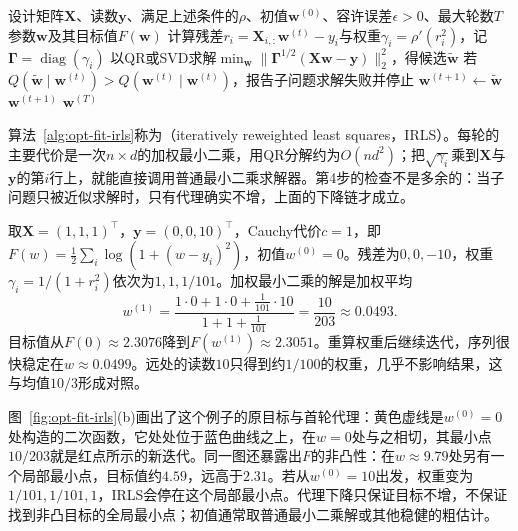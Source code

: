 \begin{algorithm}[迭代重加权最小二乘]
\label{alg:opt-fit-irls}
\begin{algorithmic}[1]
\Require 设计矩阵$\bm X$、读数$\bm y$、满足上述条件的$\rho$、初值$\bm w^{(0)}$、容许误差$\epsilon>0$、最大轮数$T$
\Ensure 参数$\bm w$及其目标值$F(\bm w)$
  \State 计算残差$r_i=\bm X_{i,:}\bm w^{(t)}-y_i$与权重$\gamma_i=\rho'(r_i^2)$，记$\bm\Gamma=\operatorname{diag}(\gamma_i)$
  \State 以QR或SVD求解$\min_{\bm w}\|\bm\Gamma^{1/2}(\bm X\bm w-\bm y)\|_2^2$，得候选$\tilde{\bm w}$
  \State 若$Q(\tilde{\bm w}\mid\bm w^{(t)})>Q(\bm w^{(t)}\mid\bm w^{(t)})$，报告子问题求解失败并停止
  \State $\bm w^{(t+1)}\gets\tilde{\bm w}$
    \State \Return $\bm w^{(t+1)}$
  \EndIf
\EndFor
\State \Return $\bm w^{(T)}$
\end{algorithmic}
\end{algorithm}

算法~\ref{alg:opt-fit-irls}称为（iteratively reweighted least squares，IRLS）。每轮的主要代价是一次$n\times d$的加权最小二乘，用QR分解约为$O(nd^2)$；把$\sqrt{\gamma_i}$乘到$\bm X$与$\bm y$的第$i$行上，就能直接调用普通最小二乘求解器。第4步的检查不是多余的：当子问题只被近似求解时，只有代理确实不增，上面的下降链才成立。

\begin{example}[用常数拟合$0,0,10$]
\label{ex:opt-fit-irls-cauchy}
取$\bm X=(1,1,1)^\top$，$\bm y=(0,0,10)^\top$，Cauchy代价$c=1$，即$F(w)=\tfrac12\sum_i\log(1+(w-y_i)^2)$，初值$w^{(0)}=0$。残差为$0,0,-10$，权重$\gamma_i=1/(1+r_i^2)$依次为$1,1,1/101$。加权最小二乘的解是加权平均
\[
  w^{(1)}=\frac{1\cdot0+1\cdot0+\tfrac1{101}\cdot10}{1+1+\tfrac1{101}}=\frac{10}{203}\approx0.0493 .
\]
目标值从$F(0)\approx2.3076$降到$F(w^{(1)})\approx2.3051$。重算权重后继续迭代，序列很快稳定在$w\approx0.0499$。远处的读数$10$只得到约$1/100$的权重，几乎不影响结果，这与均值$10/3$形成对照。
\end{example}

图~\ref{fig:opt-fit-irls}(b)画出了这个例子的原目标与首轮代理：黄色虚线是$w^{(0)}=0$处构造的二次函数，它处处位于蓝色曲线之上，在$w=0$处与之相切，其最小点$10/203$就是红点所示的新迭代。同一图还暴露出$F$的非凸性：在$w\approx9.79$处另有一个局部最小点，目标值约$4.59$，远高于$2.31$。若从$w^{(0)}=10$出发，权重变为$1/101,1/101,1$，IRLS会停在这个局部最小点。代理下降只保证目标不增，不保证找到非凸目标的全局最小点；初值通常取普通最小二乘解或其他稳健的粗估计。

